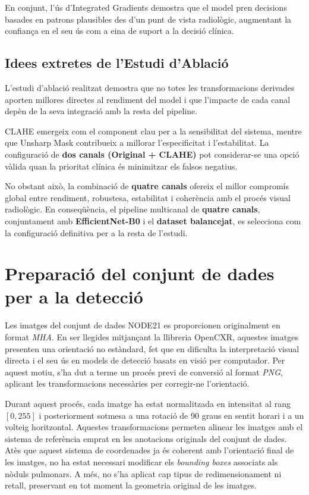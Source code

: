 \documentclass[12pt,a4paper]{article}
\begin{document}
En conjunt, l’ús d’Integrated Gradients demostra que el model pren decisions basades en
patrons plausibles des d’un punt de vista radiològic, augmentant la confiança en el seu
ús com a eina de suport a la decisió clínica.


\subsection{Idees extretes de l’Estudi d’Ablació}

L’estudi d’ablació realitzat demostra que no totes les transformacions derivades aporten
millores directes al rendiment del model i que l’impacte de cada canal depèn de la seva
integració amb la resta del pipeline.

CLAHE emergeix com el component clau per a la sensibilitat del sistema, mentre que Unsharp
Mask contribueix a millorar l’especificitat i l’estabilitat. La configuració de
\textbf{dos canals (Original + CLAHE)} pot considerar-se una opció vàlida quan la
prioritat clínica és minimitzar els falsos negatius.

No obstant això, la combinació de \textbf{quatre canals} ofereix el millor compromís global
entre rendiment, robustesa, estabilitat i coherència amb el procés visual radiològic.
En conseqüència, el pipeline multicanal de \textbf{quatre canals}, conjuntament amb
\textbf{EfficientNet-B0} i el \textbf{dataset balancejat}, es selecciona com la
configuració definitiva per a la resta de l’estudi.




\section{Preparació del conjunt de dades per a la detecció}

Les imatges del conjunt de dades NODE21 es proporcionen originalment en format \textit{MHA}. En ser llegides mitjançant la llibreria OpenCXR, aquestes imatges presenten una orientació no estàndard, fet que en dificulta la interpretació visual directa i el seu ús en models de detecció basats en visió per computador. Per aquest motiu, s’ha dut a terme un procés previ de conversió al format \textit{PNG}, aplicant les transformacions necessàries per corregir-ne l’orientació.

Durant aquest procés, cada imatge ha estat normalitzada en intensitat al rang \([0,255]\) i posteriorment sotmesa a una rotació de 90 graus en sentit horari i a un volteig horitzontal. Aquestes transformacions permeten alinear les imatges amb el sistema de referència emprat en les anotacions originals del conjunt de dades. Atès que aquest sistema de coordenades ja és coherent amb l’orientació final de les imatges, no ha estat necessari modificar els \textit{bounding boxes} associats als nòduls pulmonars. A més, no s’ha aplicat cap tipus de redimensionament ni retall, preservant en tot moment la geometria original de les imatges.
\end{document}
